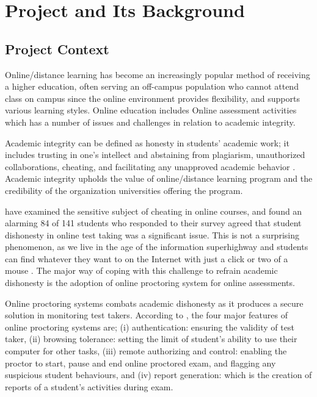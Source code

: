 \chapter{Project and Its Background}

\section{Project Context}

Online/distance learning has become an increasingly popular method of receiving a higher education, often serving an off-campus population who cannot attend class on campus \cite{daffin2018comparing} since the online environment provides flexibility, and supports various learning styles.
Online education includes Online assessment activities which has a number of issues and challenges in relation to academic integrity.

Academic integrity can be defined as honesty in students' academic work; it includes trusting in one’s intellect and abstaining from plagiarism, unauthorized collaborations, cheating, and facilitating any unapproved academic behavior \cite{cronan2017changing}.
Academic integrity upholds the value of online/distance learning program and the credibility of the organization universities offering the program.

 have examined the sensitive subject of cheating in online courses, and found an alarming 84 of 141 students who responded to their survey agreed that student dishonesty in online test taking was a significant issue.
This is not a surprising phenomenon, as we live in the age of the information superhighway and students can find whatever they want to on the Internet with just a click or two of a mouse \cite{daffin2018comparing}.
The major way of coping with this challenge to refrain academic dishonesty is the adoption of online proctoring system for online assessments.

Online proctoring systems combats academic dishonesty as it produces a secure solution in monitoring test takers.
According to , the four major features of online proctoring systems are; (i) authentication: ensuring the validity of test taker, (ii) browsing tolerance: setting the limit of student’s ability to use their computer for other tasks, (iii) remote authorizing and control: enabling the proctor to start, pause and end online proctored exam, and flagging any suspicious student behaviours, and (iv) report generation: which is the creation of reports of a student’s activities during exam.

